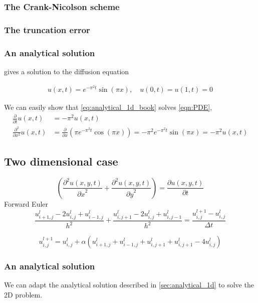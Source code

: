 \documentclass[10pt,a4paper]{article}
\newcommand{\dt}{{\Delta t}}
\newcommand{\fracpt}{\frac{\partial}{\partial t}}
\newcommand{\fracpx}{\frac{\partial}{\partial x}}
\newcommand{\fracpxx}{\frac{\partial^2}{\partial x^2}}
\newcommand{\pt}{{\partial t}}
\newcommand{\px}{{\partial x}}
\newcommand{\py}{{\partial y}}
\newcommand{\pu}{{\partial u}}
\newcommand{\ppu}{{\partial^2 u}}
\begin{document}
\subsubsection{The Crank-Nicolson scheme}


\subsubsection{The truncation error}


\subsubsection{An analytical solution}\label{sec:analytical_1d}
\cite{inf-mat2351_book} gives a solution to the diffusion equation

\begin{align}\label{eq:analytical_1d_book}
    u(x, t) = e^{-\pi^2 t} \sin(\pi x) , \quad u(0, t) = u(1, t) = 0
\end{align}

We can easily show that \vref{eq:analytical_1d_book} solves \vref{eqn:PDE},
\begin{align}
\fracpt u(x, t) &= -\pi^2 u(x, t) \\
\fracpxx u(x, t) &= \fracpx \left(\pi e^{-\pi^2 t} \cos(\pi x) \right)
= -\pi^2 e^{-\pi^2 t} \sin(\pi x) = -\pi^2 u(x, t)
\end{align}



\subsection{Two dimensional case}
\begin{equation}
\left(\frac{\ppu(x,y,t)}{\px^2} + \frac{\ppu(x,y,t)}{\py^2}\right) = \frac{\pu(x,y,t)}{\pt}
\label{eq:diffusion_2d}
\end{equation}
Forward Euler
\begin{equation}
\frac{u_{i+1,j}^l - 2u_{i,j}^l + u_{i-1,j}^l}{h^2} + \frac{u_{i,j+1}^l - 2u_{i,j}^l + u_{i,j-1}^l}{h^2} = \frac{u_{i,j}^{l+1} - u_{i,j}^l}{\dt}
\end{equation}

\begin{equation}
u_{i,j}^{l+1} = u_{i,j}^l + \alpha\left( u_{i+1,j}^l + u_{i-1,j}^l + u_{i,j+1}^l + u_{i,j+1}^l - 4u_{i,j}^l \right)
\end{equation}

\subsubsection{An analytical solution}
We can adapt the analytical solution described in \vref{sec:analytical_1d} to solve the 2D problem.
\end{document}
